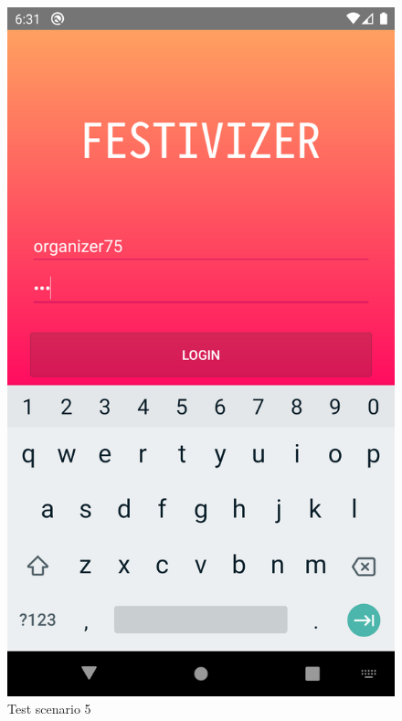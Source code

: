 			\begin{figure}[H]
				\includegraphics[width=\linewidth]{images/test_Screens/test_scenario_5-2.png}
				\caption{Test scenario 5}
				\label{fig:espresso_5_2}
			\end{figure}
		
